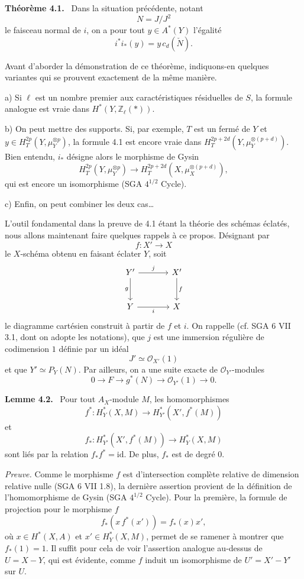 \documentclass[11pt]{article}
\newenvironment{statement}[1]{\par\medskip\noindent\textbf{#1.}\ }{\par\medskip}
\begin{document}
\begin{statement}{Théorème 4.1}
Dans la situation précédente, notant
\[
N=J/J^2
\]
le faisceau normal de $i$, on a pour tout $y\in A^*(Y)$ l'égalité
\[
i^*i_*(y)=y\,c_d(\check N).
\]
\end{statement}

Avant d'aborder la démonstration de ce théorème, indiquons-en quelques variantes qui se prouvent exactement de la même manière.

a) Si $\ell$ est un nombre premier aux caractéristiques résiduelles de $S$, la formule analogue est vraie dans $H^*(Y,\mathbb Z_\ell(*))$.

b) On peut mettre des supports. Si, par exemple, $T$ est un fermé de $Y$ et $y\in H_T^{2p}(Y,\mu_Y^{\otimes p})$, la formule 4.1 est encore vraie dans $H_T^{2p+2d}(Y,\mu_Y^{\otimes(p+d)})$. Bien entendu, $i_*$ désigne alors le morphisme de Gysin
\[
H_T^{2p}(Y,\mu_Y^{\otimes p})
\to H_T^{2p+2d}(X,\mu_X^{\otimes(p+d)}),
\]
qui est encore un isomorphisme (SGA $4^{1/2}$ Cycle).

c) Enfin, on peut combiner les deux cas\dots

L'outil fondamental dans la preuve de 4.1 étant la théorie des schémas éclatés, nous allons maintenant faire quelques rappels à ce propos. Désignant par
\[
f:X'\to X
\]
le $X$-schéma obtenu en faisant éclater $Y$, soit
\[
\begin{tikzcd}[column sep=large,row sep=large]
Y' \arrow[r,"j"] \arrow[d,"g"'] & X' \arrow[d,"f"]\\
Y \arrow[r,"i"'] & X
\end{tikzcd}
\]
le diagramme cartésien construit à partir de $f$ et $i$. On rappelle (cf. SGA 6 VII 3.1, dont on adopte les notations), que $j$ est une immersion régulière de codimension $1$ définie par un idéal
\[
J'\simeq\mathcal O_{X'}(1)
\]
et que $Y'\simeq P_Y(N)$. Par ailleurs, on a une suite exacte de $\mathcal O_{Y'}$-modules
\[
0\to F\to g^*(N)\to \mathcal O_{Y'}(1)\to0.
\]

\begin{statement}{Lemme 4.2}
Pour tout $A_X$-module $M$, les homomorphismes
\[
f^*:H_Y^*(X,M)\to H_{Y'}^*(X',f^*(M))
\]
et
\[
f_*:H_{Y'}^*(X',f^*(M))\to H_Y^*(X,M)
\]
sont liés par la relation $f_*f^*=\mathrm{id}$. De plus, $f_*$ est de degré $0$.
\end{statement}

\emph{Preuve.} Comme le morphisme $f$ est d'intersection complète relative de dimension relative nulle (SGA 6 VII 1.8), la dernière assertion provient de la définition de l'homomorphisme de Gysin (SGA $4^{1/2}$ Cycle). Pour la première, la formule de projection pour le morphisme $f$
\[
f_*(x\,f^*(x'))=f_*(x)x',
\]
où $x\in H^*(X,A)$ et $x'\in H_Y^*(X,M)$, permet de se ramener à montrer que $f_*(1)=1$. Il suffit pour cela de voir l'assertion analogue au-dessus de $U=X-Y$, qui est évidente, comme $f$ induit un isomorphisme de $U'=X'-Y'$ sur $U$.
\end{document}
